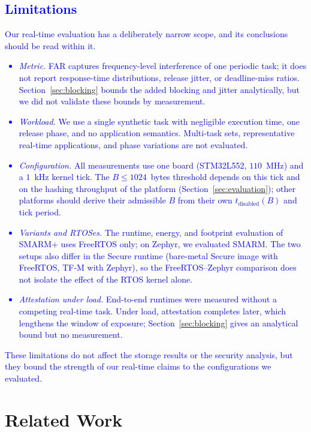 \documentclass[journal]{IEEEtran}
\newcommand\ben[1]{\textcolor{blue}{#1}}
\newcommand{\rtsmarm}{SMARM+\xspace}
\begin{document}
\subsection{\ben{Limitations}}
\label{sec:limitations}
\ben{Our real-time evaluation has a deliberately narrow scope, and its conclusions should be read within it.
\begin{itemize}
  \item \emph{Metric.} FAR captures frequency-level interference of one periodic task; it does not report response-time distributions, release jitter, or deadline-miss ratios. Section~\ref{sec:blocking} bounds the added blocking and jitter analytically, but we did not validate these bounds by measurement.
  \item \emph{Workload.} We use a single synthetic task with negligible execution time, one release phase, and no application semantics. Multi-task sets, representative real-time applications, and phase variations are not evaluated.
  \item \emph{Configuration.} All measurements use one board (STM32L552, $110$~MHz) and a $1$~kHz kernel tick. The $B \le 1024$~bytes threshold depends on this tick and on the hashing throughput of the platform (Section~\ref{sec:evaluation}); other platforms should derive their admissible $B$ from their own $t_{\text{disabled}}(B)$ and tick period.
  \item \emph{Variants and RTOSes.} The runtime, energy, and footprint evaluation of \rtsmarm uses FreeRTOS only; on Zephyr, we evaluated SMARM. The two setups also differ in the Secure runtime (bare-metal Secure image with FreeRTOS, TF-M with Zephyr), so the FreeRTOS--Zephyr comparison does not isolate the effect of the RTOS kernel alone.

  \item \emph{Attestation under load.} End-to-end runtimes were measured without a competing real-time task. Under load, attestation completes later, which lengthens the window of exposure; Section~\ref{sec:blocking} gives an analytical bound but no measurement.
\end{itemize}
These limitations do not affect the storage results or the security analysis, but they bound the strength of our real-time claims to the configurations we evaluated.}


\section{Related Work}
\label{sec:related}
\end{document}
